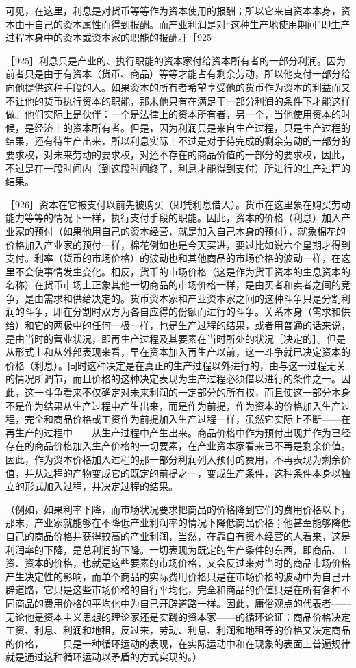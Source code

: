 可见，在这里，利息是对货币等等作为资本使用的报酬；所以它来自资本本身，资本由于自己的资本属性而得到报酬。而产业利润是对“这种生产地使用期间”即生产过程本身中的资本或资本家的职能的报酬。｝［925］

［925］利息只是产业的、执行职能的资本家付给资本所有者的一部分利润。因为前者只是由于有资本（货币、商品）等等才能占有剩余劳动，所以他支付一部分给向他提供这种手段的人。如果资本的所有者希望享受他的货币作为资本的利益而又不让他的货币执行资本的职能，那末他只有在满足于一部分利润的条件下才能这样做。他们实际上是伙伴：一个是法律上的资本所有者，另一个，当他使用资本的时候，是经济上的资本所有者。但是，因为利润只是来自生产过程，只是生产过程的结果，还有待生产出来，所以利息实际上不过是对于待完成的剩余劳动的一部分的要求权，对未来劳动的要求权，对还不存在的商品价值的一部分的要求权，因此，不过是在一段时间内（到这段时间终了，利息才能得到支付）所进行的生产过程的结果。

［926］资本在它被支付以前先被购买（即凭利息借入）。货币在这里象在购买劳动能力等等的情况下一样，执行支付手段的职能。因此，资本的价格（利息）加入产业家的预付（如果他用自己的资本经营，就是加入自己本身的预付），就象棉花的价格加入产业家的预付一样，棉花例如也是今天买进，要过比如说六个星期才得到支付。利率（货币的市场价格）的波动也和其他商品的市场价格的波动一样，在这里不会使事情发生变化。相反，货币的市场价格（这是作为货币资本的生息资本的名称）在货币市场上正象其他一切商品的市场价格一样，是由买者和卖者之间的竞争，是由需求和供给决定的。货币资本家和产业资本家之间的这种斗争只是分割利润的斗争，即在分割时双方为各自应得的份额而进行的斗争。关系本身（需求和供给）和它的两极中的任何一极一样，也是生产过程的结果，或者用普通的话来说，是由当时的营业状况，即再生产过程及其要素在当时所处的状况［决定的］。但是从形式上和从外部表现来看，早在资本加入再生产以前，这一斗争就已决定资本的价格（利息）。同时这种决定是在真正的生产过程以外进行的，由与这一过程无关的情况所调节，而且价格的这种决定表现为生产过程必须借以进行的条件之一。因此，这一斗争看来不仅确定对未来利润的一定部分的所有权，而且使这一部分本身不是作为结果从生产过程中产生出来，而是作为前提，作为资本的价格加入生产过程，完全和商品价格或工资作为前提加入生产过程一样，虽然它实际上不断——在再生产的过程中——从生产过程中产生出来。商品价格中作为预付出现并作为已经存在的商品价格加入生产价格的一切要素，在产业资本家看来已不再是剩余价值。因此，作为资本价格加入过程的那一部分利润列入预付的费用，不再表现为剩余价值，并从过程的产物变成它的既定的前提之一，变成生产条件，这种条件本身以独立的形式加入过程，并决定过程的结果。

（例如，如果利率下降，而市场状况要求把商品的价格降到它们的费用价格以下，那末，产业家就能够在不降低产业利润率的情况下降低商品价格；他甚至能够降低自己的商品价格并获得较高的产业利润，当然，在靠自有资本经营的人看来，这是利润率的下降，是总利润的下降。一切表现为既定的生产条件的东西，即商品、工资、资本的价格，也就是这些要素的市场价格，又会反过来对当时的商品市场价格产生决定性的影响，而单个商品的实际费用价格只是在市场价格的波动中为自己开辟道路，它只是这些市场价格的自行平均化，完全和商品的价值只是在所有各种不同商品的费用价格的平均化中为自己开辟道路一样。因此，庸俗观点的代表者——无论他是资本主义思想的理论家还是实践的资本家——的循环论证：商品价格决定工资、利息、利润和地租，反过来，劳动、利息、利润和地租等的价格又决定商品的价格，——只是一种循环运动的表现，在实际运动中和在现象的表面上普遍规律就是通过这种循环运动以矛盾的方式实现的。）

